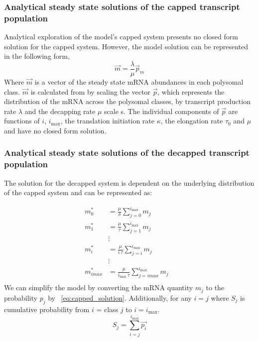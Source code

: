 \documentclass[review]{elsarticle}
\newcommand{\imax}{\ensuremath{i_{\max}}\xspace}
\begin{document}
\subsubsection{Analytical steady state solutions of the capped transcript population}
Analytical exploration of the model's capped system presents no closed form solution for the capped system.
However, the model solution can be represented in the following form,
	\begin{equation} \label{eq:capped_solution}
		\vec{m}=\frac{\lambda}{\mu}\vec{p}_m
	\end{equation}
Where $\vec{m}$ is a vector of the steady state mRNA abundances in each polysomal class.
$\vec{m}$ is calculated from by scaling  the vector $\vec{p}$, which represents the distribution of the mRNA across the polysomal classes, by transcript production rate $\lambda$ and the decapping rate $\mu$ scale s.
The individual components of $\vec{p}$ are functions of $i$, \imax, the translation initiation rate $\kappa$, the elongation rate $\tau_0$ and $\mu$ and have no closed form solution.

\subsubsection{Analytical steady state solutions of the decapped transcript population}

The solution for the decapped system is dependent on the underlying distribution of the capped system and can be represented as:

\begin{align*}
m_{0}^{*}  &= \frac{\mu}{\delta}\sum_{j=0}^{\imax}m_{j} \\
m_{1}^{*}  &= \frac{\mu}{\tau}\sum_{j=1}^{\imax}m_{j}  \\
& \vdots & \\
m_{i}^{*}  &= \frac{\mu}{i \: \tau}\sum_{j=i}^{\imax}m_{j}  \\
& \vdots & \\
m_{imax}^{*}  &= \frac{\mu}{\imax \: \tau}\sum_{j=imax}^{\imax}m_{j}  \\
\end{align*}
We can simplify the model by converting the mRNA quantity $m_{j}$ to the probability $p_{j}$ by ~\ref{eq:capped_solution}.
Additionally, for any $i=j$ where $S_{j}$ is cumulative probability from $i$ = class $j$ to $ i= \imax$.
\begin{equation}
		S_{j} = \sum_{i=j}^{\imax}\vec{p_{i}}
\end{equation}
\end{document}
